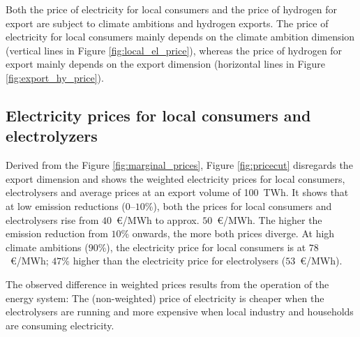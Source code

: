 Both the price of electricity for local consumers and the price of hydrogen for export are subject to climate ambitions and hydrogen exports. The price of electricity for local consumers mainly depends on the climate ambition dimension (vertical lines in Figure \ref{fig:local_el_price}), whereas the price of hydrogen for export mainly depends on the export dimension (horizontal lines in Figure \ref{fig:export_hy_price}).



\subsection{Electricity prices for local consumers and electrolyzers}
\label{subsec:economic_benefits}
Derived from the Figure \ref{fig:marginal_prices}, Figure \ref{fig:pricecut} disregards the export dimension and shows the weighted electricity prices for local consumers, electrolysers and average prices at an export volume of 100~TWh. It shows that at low emission reductions ($0$--$10$\%), both the prices for local consumers and electrolysers rise from $40$~\euro/MWh to approx. $50$~\euro/MWh. The higher the emission reduction from $10$\% onwards, the more both prices diverge. At high climate ambitions ($90$\%), the electricity price for local consumers is at $78$~\euro/MWh; $47$\% higher than the electricity price for electrolysers ($53$~\euro/MWh).

The observed difference in weighted prices results from the operation of the energy system: The (non-weighted) price of electricity is cheaper when the electrolysers are running and more expensive when local industry and households are consuming electricity.

